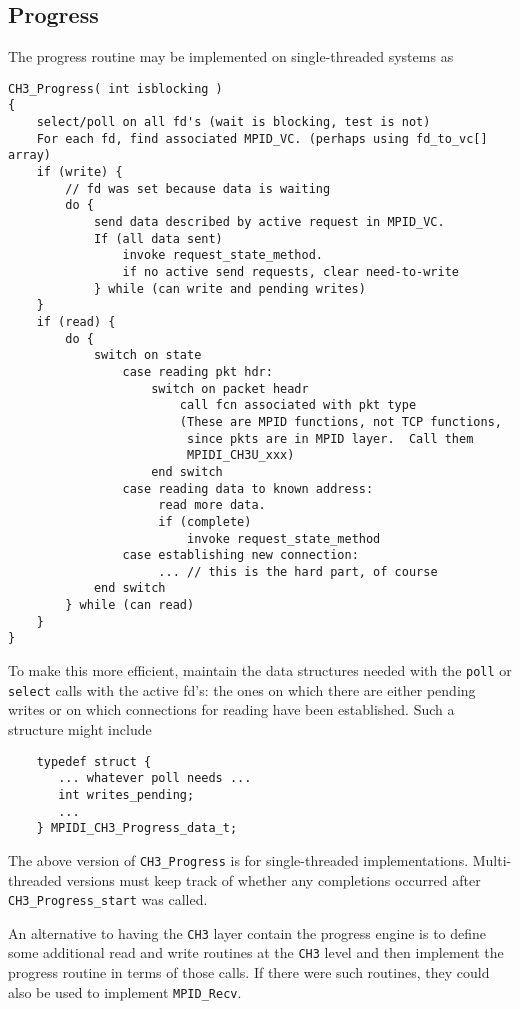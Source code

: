 \documentclass{article}
\def\code{\begingroup\makeustext\eatcode}
\def\eatcode#1{\texttt{#1}\endgroup}
\begin{document}
\subsection{Progress}
\label{sec:progress}
The progress routine may be implemented on single-threaded systems as
\begin{verbatim}
CH3_Progress( int isblocking )
{
    select/poll on all fd's (wait is blocking, test is not)
    For each fd, find associated MPID_VC. (perhaps using fd_to_vc[] array)
    if (write) {
        // fd was set because data is waiting
        do {
            send data described by active request in MPID_VC.  
            If (all data sent)
                invoke request_state_method.
                if no active send requests, clear need-to-write
            } while (can write and pending writes)
    }
    if (read) {
        do {
            switch on state
                case reading pkt hdr: 
                    switch on packet headr
                        call fcn associated with pkt type
                        (These are MPID functions, not TCP functions, 
                         since pkts are in MPID layer.  Call them
                         MPIDI_CH3U_xxx) 
                    end switch
                case reading data to known address:
                     read more data.
                     if (complete)
                         invoke request_state_method
                case establishing new connection:
                     ... // this is the hard part, of course
            end switch
        } while (can read)
    }
}
\end{verbatim}
To make this more efficient, maintain the data structures needed with the
\code{poll} or \code{select} calls with the active fd's: the ones on which
there are either pending writes or on which connections for reading have been
established.  Such a structure might include
\begin{verbatim}
    typedef struct { 
       ... whatever poll needs ...
       int writes_pending;
       ...
    } MPIDI_CH3_Progress_data_t;
\end{verbatim}

The above version of \code{CH3_Progress} is for single-threaded
implementations.  Multi-threaded versions must keep track of whether any
completions occurred after \code{CH3_Progress_start} was called.

An alternative to having the \code{CH3} layer contain the progress engine is
to define some additional read and write routines at the \code{CH3} level and
then implement the progress routine in terms of those calls.  If there were
such routines, they could also be used to implement \code{MPID_Recv}.  
\end{document}
